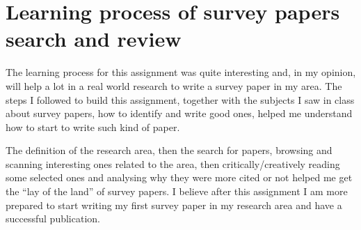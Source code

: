 \section{Learning process of survey papers search and review}

The learning process for this assignment was quite interesting and, in my opinion, will help a lot in a real world research to write a survey paper in my area. The steps I followed to build this assignment, together with the subjects I saw in class about survey papers, how to identify and write good ones, helped me understand how to start to write such kind of paper.

The definition of the research area, then the search for papers, browsing and scanning interesting ones related to the area, then critically/creatively reading some selected ones and analysing why they were more cited or not helped me get the ``lay of the land'' of survey papers. I believe after this assignment I am more prepared to start writing my first survey paper in my research area and have a successful publication.